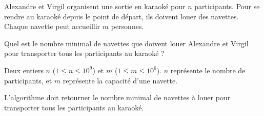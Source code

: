 \problemname{\problemyamlname}


Alexandre et Virgil organisent une sortie en karaoké pour $n$ participants.
Pour se rendre au karaoké depuis le point de départ, ils doivent louer des navettes. Chaque navette peut accueillir $m$ personnes.

Quel est le nombre minimal de navettes que doivent louer Alexandre et Virgil pour transporter tous les participants au karaoké ?

\begin{Input}
	Deux entiers $n$ ($1 \le n \le 10^9$) et $m$ ($1 \le m \le 10^6$). $n$ représente le nombre de participants, et $m$ représente la capacité d'une navette.
\end{Input}

\begin{Output}
	L'algorithme doit retourner le nombre minimal de navettes à louer pour transporter tous les participants au karaoké.
\end{Output}

